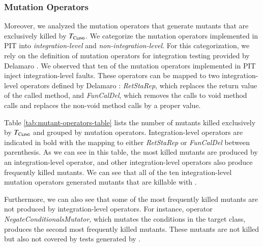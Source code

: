 \subsubsection{Mutation Operators}

Moreover, we analyzed the mutation operators that generate mutants that are exclusively killed by $T_{\textsc{Cling}}$. We categorize the mutation operators implemented in PIT into \textit{integration-level} and \textit{non-integration-level}. For this categorization, we rely on the definition of mutation operators for integration testing provided by Delamaro \etal \cite{delamaro2001interface}. 
We observed that ten of the mutation operators implemented in PIT inject integration-level faults. These operators can be mapped to two integration-level operators defined by Delamaro \etal \cite{delamaro2001interface}: \textit{RetStaRep}, which replaces the return value of the called method, and \textit{FunCalDel}, which removes the calls to void method calls and replaces the non-void method calls by a proper value.

Table \ref{tab:mutant-operators-table} lists the number of mutants killed exclusively by $T_{\textsc{Cling}}$ and grouped by mutation operators. Integration-level operators are indicated in bold with the mapping to either \textit{RetStaRep} or \textit{FunCalDel} between parenthesis. As we can see in this table, the most killed mutants are produced by an integration-level operator, and other integration-level operators also produce frequently killed mutants. 
We can see that all of the ten integration-level mutation operators generated mutants that are killable with \integration. 

Furthermore, we can also see that some of the most frequently killed mutants are not produced by integration-level operators. For instance, operator \textit{NegateConditionalsMutator}, which mutates the conditions in the target class, produces the second most frequently killed mutants. These mutants are not killed but also not covered by tests generated by \evosuite.


